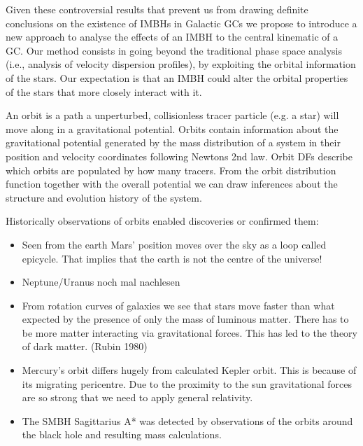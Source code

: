 \par Given these controversial results that prevent us from drawing definite conclusions on the existence of \acp{IMBH} in Galactic \acp{GC} we propose to introduce a new approach to analyse the effects of an \ac{IMBH} to the central kinematic of a \ac{GC}. Our method consists in going beyond the traditional phase space analysis (i.e., analysis of velocity dispersion profiles), by exploiting the orbital information of the stars. Our expectation is that an \ac{IMBH} could alter the orbital properties of the stars that more closely interact with it.
\\

\par An orbit is a path a unperturbed, collisionless tracer particle (e.g. a star) will move along in a gravitational potential. Orbits contain information about the gravitational potential generated by the mass distribution of a system in their position and velocity coordinates following Newtons 2nd law. Orbit \acp{DF} describe which orbits are populated by how many tracers. From the orbit distribution function together with the overall potential we can draw inferences about the structure and evolution history of the system. 
\par Historically observations of orbits enabled discoveries or confirmed them: 
\begin{itemize}
\item Seen from the earth Mars' position moves over the sky as a loop called epicycle. That implies that the earth is not the centre of the universe! \citep[p.3]{2006ima..book.....C}
\item Neptune/Uranus \color{red} noch mal nachlesen \color{black}
\item From rotation curves of galaxies we see that stars move faster than what expected by the presence of only the mass of luminous matter. There has to be more matter interacting via gravitational forces. This has led to the theory of dark matter. (Rubin 1980)
\item Mercury's orbit differs hugely from calculated Kepler orbit. This is because of its migrating pericentre. Due to the proximity to the sun gravitational forces are so strong that we need to apply general relativity.
\item The \ac{SMBH} Sagittarius A*  was detected by observations of the orbits around the black hole and resulting mass calculations. \citep[p.923]{2006ima..book.....C} 
\end{itemize}
